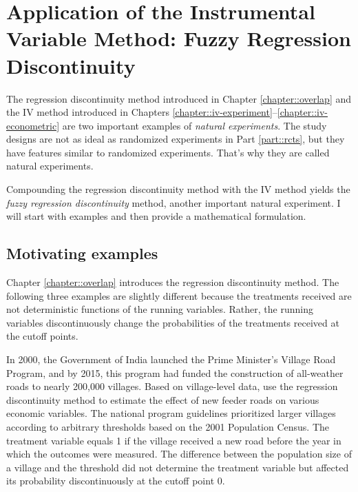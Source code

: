  
\chapter{Application of the Instrumental Variable Method: Fuzzy Regression Discontinuity}
 \label{chapter::iv-frdd}



The regression discontinuity method introduced in Chapter \ref{chapter::overlap} and the IV method introduced in Chapters \ref{chapter::iv-experiment}--\ref{chapter::iv-econometric} are two important examples of {\it natural experiments}. The study designs are not as ideal as randomized experiments in Part \ref{part::rcts}, but they have features similar to randomized experiments. That's why they are called natural experiments. 


Compounding the regression discontinuity method with the IV method yields the {\it fuzzy regression discontinuity} method, another important natural experiment. I will start with examples and then provide a mathematical formulation.  




\section{Motivating examples}
\label{sec::frdd-motivation}

Chapter \ref{chapter::overlap} introduces the regression discontinuity method. The following three examples are slightly different because the treatments received are not deterministic functions of the running variables. Rather, the running variables discontinuously change the probabilities of the treatments received at the cutoff points. 

\begin{example}\label{eg::indianroad}
In 2000, the Government of India launched the Prime Minister's Village Road Program, and by 2015, this program had funded the construction of all-weather roads to nearly 200,000 villages.  Based on village-level data, 
\citet{asher2020rural} use the regression discontinuity method to estimate the effect of new feeder roads on various economic variables. The national program guidelines prioritized larger villages according to arbitrary thresholds based on the 2001 Population Census. The treatment variable equals 1 if the village received a new road before the year in which the outcomes were measured. The difference between the population size of a village and the threshold did not determine the treatment variable but affected its probability discontinuously at the cutoff point 0. 
\end{example}


